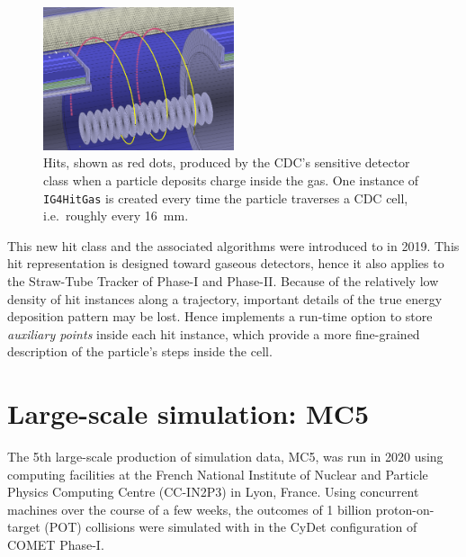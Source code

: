 \begin{figure}
    \centering
    \includegraphics[width=0.5\textwidth]{chapter3/hit_instances_blur_crop.png}
    \caption{Hits, shown as red dots, produced by the CDC's sensitive detector class when a particle deposits charge inside the gas. One instance of \texttt{IG4HitGas} is created every time the particle traverses a CDC cell, i.e.\ roughly every \SI{16}{mm}.}
    \label{fig:sim_cdc_hits}
\end{figure}


This new hit class and the associated algorithms were introduced to \SimG in 2019. This hit representation is designed toward gaseous detectors, hence it also applies to the Straw-Tube Tracker of Phase-I and Phase-II. 
Because of the relatively low density of hit instances along a trajectory, important details of the true energy deposition pattern may be lost. Hence \SimG implements a run-time option to store \emph{auxiliary points} inside each hit instance, which provide a more fine-grained description of the particle's steps inside the cell.




\section{Large-scale simulation: MC5}
\label{sec:mc5}
The 5th large-scale production of simulation data, MC5, was run in 2020 using computing facilities at the French National Institute of Nuclear and Particle Physics Computing Centre (CC-IN2P3) in Lyon, France.
Using  concurrent machines over the course of a few weeks, the outcomes of 1 billion proton-on-target (POT) collisions were simulated with \SimG in the CyDet configuration of COMET Phase-I.

